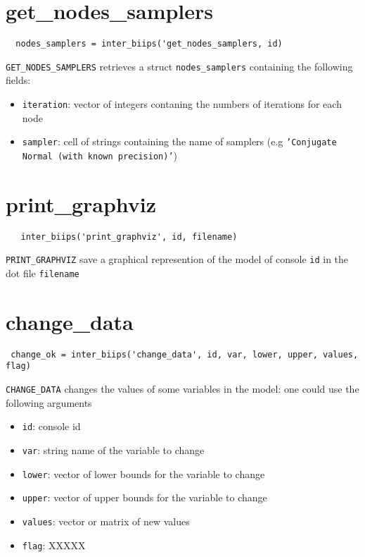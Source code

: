 \documentclass[11pt]{article}
\begin{document}
\section{get\_nodes\_samplers}

 \begin{lstlisting}
  nodes_samplers = inter_biips('get_nodes_samplers, id)
 \end{lstlisting}
  
  \texttt{GET\_NODES\_SAMPLERS} retrieves a struct \texttt{nodes\_samplers} containing the following fields:

  \begin{itemize}
   \item \texttt{iteration}: vector of integers contaning the numbers of iterations for each node
   \item \texttt{sampler}: cell of strings containing the name of samplers (e.g \texttt{'Conjugate Normal (with known precision)'}) 
   \end{itemize}


\section{print\_graphviz}

 \begin{lstlisting}
   inter_biips('print_graphviz', id, filename)
 \end{lstlisting}
 
  \texttt{PRINT\_GRAPHVIZ} save a graphical represention of the model of console \texttt{id} in the dot file \texttt{filename}

\section{change\_data}

 \begin{lstlisting} 
 change_ok = inter_biips('change_data', id, var, lower, upper, values, flag)
 \end{lstlisting}

 \texttt{CHANGE\_DATA} changes the values of some variables in the model: one could use the following 
  arguments

  \begin{itemize}
   \item \texttt{id}: console id
   \item \texttt{var}: string name of the variable to change
   \item \texttt{lower}: vector of lower bounds for the variable to change 
   \item \texttt{upper}: vector of upper bounds for the variable to change 
   \item \texttt{values}: vector or matrix of new values 
   \item \texttt{flag}: XXXXX
   \end{itemize}
\end{document}
